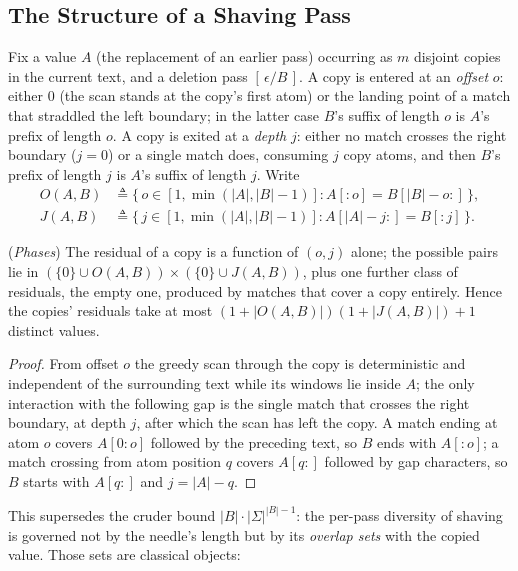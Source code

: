 \subsection{The Structure of a Shaving Pass}

Fix a value $A$ (the replacement of an earlier pass) occurring as
$m$ disjoint copies in the current text, and a deletion pass
$[\,\epsilon/B\,]$.  A copy is entered at an \emph{offset} $o$: either
$0$ (the scan stands at the copy's first atom) or the landing point of
a match that straddled the left boundary; in the latter case $B$'s
suffix of length $o$ is $A$'s prefix of length $o$.  A copy is exited
at a \emph{depth} $j$: either no match crosses the right boundary
($j = 0$) or a single match does, consuming $j$ copy atoms, and then
$B$'s prefix of length $j$ is $A$'s suffix of length $j$.  Write
\begin{align*}
    O(A,B) &\triangleq \{\, o \in [1, \min(|A|,|B|{-}1)] :
              A[{:}o] = B[|B|{-}o{:}] \,\}, \\
    J(A,B) &\triangleq \{\, j \in [1, \min(|A|,|B|{-}1)] :
              A[|A|{-}j{:}] = B[{:}j] \,\}.
\end{align*}

\begin{lemma}
    (\emph{Phases})
    \label{lem:phase}
    The residual of a copy is a function of $(o, j)$ alone; the possible
    pairs lie in $(\{0\} \cup O(A,B)) \times (\{0\} \cup J(A,B))$, plus one
    further class of residuals, the empty one, produced by matches that
    cover a copy entirely.  Hence the copies' residuals take at most
    $(1 + |O(A,B)|)(1 + |J(A,B)|) + 1$ distinct values.
\end{lemma}

\begin{proof}
    From offset $o$ the greedy scan through the copy is deterministic
    and independent of the surrounding text while its windows lie
    inside $A$; the only interaction with the following gap is the
    single match that crosses the right boundary, at depth $j$, after
    which the scan has left the copy.  A match ending at atom $o$
    covers $A[0{:}o]$ followed by the preceding text, so $B$ ends with
    $A[{:}o]$; a match crossing from atom position $q$ covers
    $A[q{:}]$ followed by gap characters, so $B$ starts with
    $A[q{:}]$ and $j = |A| - q$.
\end{proof}

This supersedes the cruder bound
$|B| \cdot |\Sigma|^{|B|-1}$: the per-pass diversity of shaving is
governed not by the needle's length but by its \emph{overlap sets} with
the copied value.  Those sets are classical objects:

